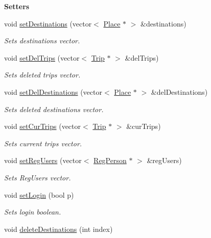 \begin{Indent}{\bf Setters}\par
\begin{DoxyCompactItemize}
\item 
void \hyperlink{class_logic_a4a9be2e73420f5a8598213b879d17ebe}{set\+Destinations} (vector$<$ \hyperlink{class_place}{Place} $\ast$ $>$ \&destinations)
\begin{DoxyCompactList}\small\item\em Sets destinations vector. \end{DoxyCompactList}\item 
void \hyperlink{class_logic_a523cdc227c59eb80c1e46176c66f1ac0}{set\+Del\+Trips} (vector$<$ \hyperlink{class_trip}{Trip} $\ast$ $>$ \&del\+Trips)
\begin{DoxyCompactList}\small\item\em Sets deleted trips vector. \end{DoxyCompactList}\item 
void \hyperlink{class_logic_a145bd484d1d24209680040e5786b0f45}{set\+Del\+Destinations} (vector$<$ \hyperlink{class_place}{Place} $\ast$ $>$ \&del\+Destinations)
\begin{DoxyCompactList}\small\item\em Sets deleted destinations vector. \end{DoxyCompactList}\item 
void \hyperlink{class_logic_a09a3f9b2cff30ce084ebf0f6f7349c61}{set\+Cur\+Trips} (vector$<$ \hyperlink{class_trip}{Trip} $\ast$ $>$ \&cur\+Trips)
\begin{DoxyCompactList}\small\item\em Sets current trips vector. \end{DoxyCompactList}\item 
void \hyperlink{class_logic_a7488585d2b9b45664914ba30f2ac05c5}{set\+Reg\+Users} (vector$<$ \hyperlink{class_reg_person}{Reg\+Person} $\ast$ $>$ \&reg\+Users)
\begin{DoxyCompactList}\small\item\em Sets Reg\+Users vector. \end{DoxyCompactList}\item 
void \hyperlink{class_logic_a08edb05c231e1b371ac5794c3f362ffb}{set\+Login} (bool p)
\begin{DoxyCompactList}\small\item\em Sets login boolean. \end{DoxyCompactList}\item 
void \hyperlink{class_logic_a4ef9baca3ed6362b7a918a2ed0ce0183}{delete\+Destinations} (int index)

\end{DoxyCompactItemize}
\end{Indent}
